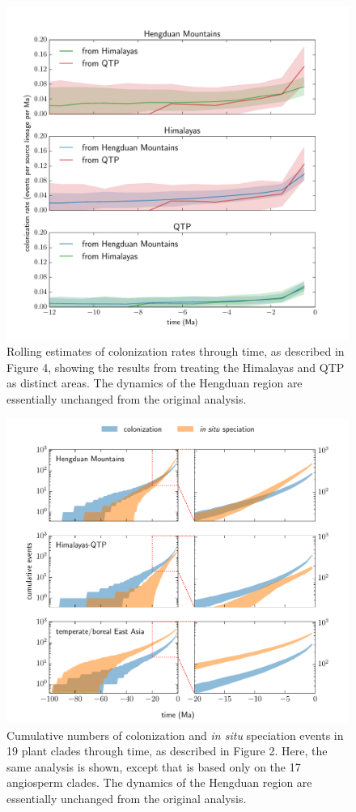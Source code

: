 \begin{figure}
\centering
\includegraphics[width=.99\linewidth]{figures/dispersal-rates-qtp.pdf}
\caption{Rolling estimates of colonization rates through time, as
  described in Figure 4, showing the results from treating the
  Himalayas and QTP as distinct areas. The dynamics of the Hengduan
  region are essentially unchanged from the original analysis.}
\label{fig:dispersal:qtp}
\end{figure}

\begin{figure}
\centering
\includegraphics[width=.99\linewidth]{figures/cumulative-events-angiosperms.pdf}
\caption{Cumulative numbers of colonization and \textit{in situ}
  speciation events in 19 plant clades through time, as described in
  Figure 2. Here, the same analysis is shown, except that is based
  only on the 17 angiosperm clades. The dynamics of the Hengduan
  region are essentially unchanged from the original analysis.}
\label{fig:cumevents:angios}
\end{figure}

